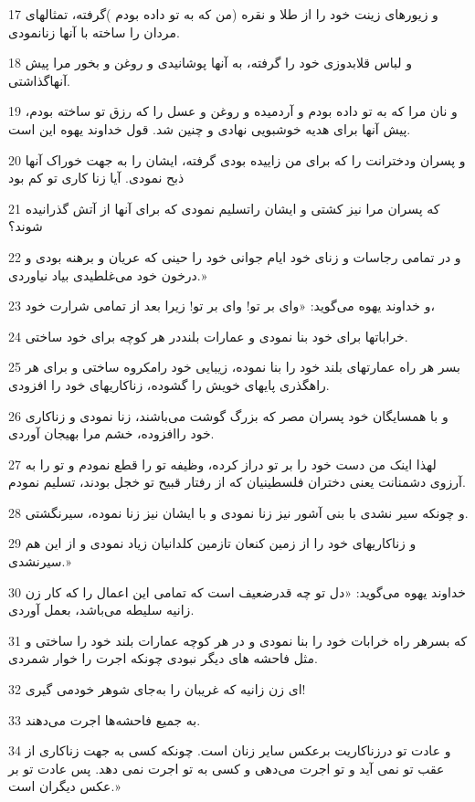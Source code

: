 \par 17 و زیورهای زینت خود را از طلا و نقره (من که به تو داده بودم )گرفته، تمثالهای مردان را ساخته با آنها زنانمودی.
\par 18 و لباس قلابدوزی خود را گرفته، به آنها پوشانیدی و روغن و بخور مرا پیش آنهاگذاشتی.
\par 19 و نان مرا که به تو داده بودم و آردمیده و روغن و عسل را که رزق تو ساخته بودم، پیش آنها برای هدیه خوشبویی نهادی و چنین شد. قول خداوند یهوه این است.
\par 20 و پسران ودخترانت را که برای من زاییده بودی گرفته، ایشان را به جهت خوراک آنها ذبح نمودی. آیا زنا کاری تو کم بود
\par 21 که پسران مرا نیز کشتی و ایشان راتسلیم نمودی که برای آنها از آتش گذرانیده شوند؟
\par 22 و در تمامی رجاسات و زنای خود ایام جوانی خود را حینی که عریان و برهنه بودی و درخون خود می‌غلطیدی بیاد نیاوردی.»
\par 23 و خداوند یهوه می‌گوید: «وای بر تو! وای بر تو! زیرا بعد از تمامی شرارت خود،
\par 24 خراباتها برای خود بنا نمودی و عمارات بلنددر هر کوچه برای خود ساختی.
\par 25 بسر هر راه عمارتهای بلند خود را بنا نموده، زیبایی خود رامکروه ساختی و برای هر راهگذری پایهای خویش را گشوده، زناکاریهای خود را افزودی.
\par 26 و با همسایگان خود پسران مصر که بزرگ گوشت می‌باشند، زنا نمودی و زناکاری خود راافزوده، خشم مرا بهیجان آوردی.
\par 27 لهذا اینک من دست خود را بر تو دراز کرده، وظیفه تو را قطع نمودم و تو را به آرزوی دشمنانت یعنی دختران فلسطینیان که از رفتار قبیح تو خجل بودند، تسلیم نمودم.
\par 28 و چونکه سیر نشدی با بنی آشور نیز زنا نمودی و با ایشان نیز زنا نموده، سیرنگشتی.
\par 29 و زناکاریهای خود را از زمین کنعان تازمین کلدانیان زیاد نمودی و از این هم سیرنشدی.»
\par 30 خداوند یهوه می‌گوید: «دل تو چه قدرضعیف است که تمامی این اعمال را که کار زن زانیه سلیطه می‌باشد، بعمل آوردی.
\par 31 که بسرهر راه خرابات خود را بنا نمودی و در هر کوچه عمارات بلند خود را ساختی و مثل فاحشه های دیگر نبودی چونکه اجرت را خوار شمردی.
\par 32 ‌ای زن زانیه که غریبان را به‌جای شوهر خودمی گیری!
\par 33 به جمیع فاحشه‌ها اجرت می‌دهند.
\par 34 و عادت تو درزناکاریت برعکس سایر زنان است. چونکه کسی به جهت زناکاری از عقب تو نمی آید و تو اجرت می‌دهی و کسی به تو اجرت نمی دهد. پس عادت تو بر عکس دیگران است.»
